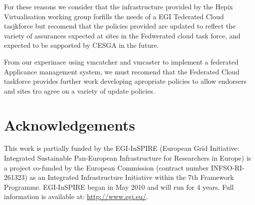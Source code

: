 \documentclass{llncs_Ibergrid2013}
\begin{document}
For these reasons we consider that the infrastructure provided by the Hepix Virtualisation working group forfills the needs of a EGI Tederated Cloud tasjkforce but recomend that the policies provided are updated to reflect the variety of assurances expected at sites in the Fedwerated cloud task force, and expected to be supported by CESGA in the future.

From our experinace using vmcatcher and vmcaster to implement a federated Applicance management system, we must recomend that the Federated Cloud taskforce provides further work developing apropriate policies to allow endorsers and sites tro agree on a variety of update policies. 
\section*{Acknowledgements}
\label{sect-acknowledgements}
This work is partially funded by the  EGI-InSPIRE (European Grid Initiative: Integrated Sustainable
Pan-European Infrastructure for Researchers in Europe) is a project co-funded by the European Commission 
(contract number INFSO-RI-261323) as an Integrated Infrastructure Initiative within the 7th Framework 
Programme. EGI-InSPIRE began in May 2010 and will run for 4 years. Full information is available at:
\url{http://www.egi.eu/}.

%
%
%


%






\end{document}
